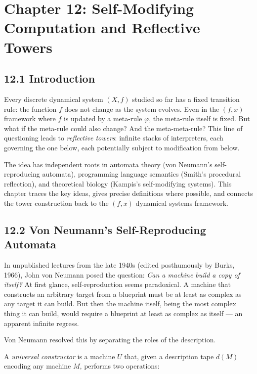\chapter{Chapter 12: Self-Modifying Computation and Reflective Towers}

\section{12.1 Introduction}

Every discrete dynamical system $(X, f)$ studied so far has a fixed transition rule: the function $f$ does not change as the system evolves. Even in the $(f, x)$ framework where $f$ is updated by a meta-rule $\varphi$, the meta-rule itself is fixed. But what if the meta-rule could also change? And the meta-meta-rule? This line of questioning leads to \textit{reflective towers}: infinite stacks of interpreters, each governing the one below, each potentially subject to modification from below.

The idea has independent roots in automata theory (von Neumann's self-reproducing automata), programming language semantics (Smith's procedural reflection), and theoretical biology (Kampis's self-modifying systems). This chapter traces the key ideas, gives precise definitions where possible, and connects the tower construction back to the $(f, x)$ dynamical systems framework.

\section{12.2 Von Neumann's Self-Reproducing Automata}

In unpublished lectures from the late 1940s (edited posthumously by Burks, 1966), John von Neumann posed the question: \textit{Can a machine build a copy of itself?} At first glance, self-reproduction seems paradoxical. A machine that constructs an arbitrary target from a blueprint must be at least as complex as any target it can build. But then the machine itself, being the most complex thing it can build, would require a blueprint at least as complex as itself --- an apparent infinite regress.

Von Neumann resolved this by separating the roles of the description.

\begin{definition}
A \textit{universal constructor} is a machine $U$ that, given a description tape $d(M)$ encoding any machine $M$, performs two operations:
\end{definition}

